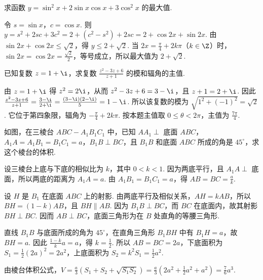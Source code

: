 \documentclass[UTF8,a4paper,oneside,11pt]{ctexbook}
\begin{document}
\begin{problem}
求函数 \(y = \sin^{2} x + 2\sin x\cos x + 3\cos^{2} x\) 的最大值.
\end{problem}

\begin{solution}
令 \(s=\sin x\)，\(c=\cos x\). 则
\(y=s^2+2sc+3c^2=2+(c^2-s^2)+2sc=2+\cos2x+\sin2x\).
由 \(\sin2x+\cos2x\leq\sqrt2\)，得 \(y\leq2+\sqrt2\). 当 \(2x=\frac\pi4+2k\pi\)（\(k\in\Z\)）时，\(\sin2x=\cos2x=\frac{\sqrt2}{2}\)，等号成立，所以最大值为 \(2+\sqrt2\).
\end{solution}

\begin{problem}
已知复数 \(z = 1 + \i\)，求复数 \(\frac{z^{2} - 3z + 6}{z + 1}\) 的模和辐角的主值.
\end{problem}

\begin{solution}
由 \(z=1+\i\) 得 \(z^2=2\i\)，从而 \(z^2-3z+6=3-\i\)，且 \(z+1=2+\i\). 因此
\(\frac{z^2-3z+6}{z+1}=\frac{3-\i}{2+\i}=\frac{(3-\i)(2-\i)}{5}=1-\i\).
所以该复数的模为 \(\sqrt{1^2+(-1)^2}=\sqrt2\). 它位于第四象限，辐角为 \(-\frac\pi4+2k\pi\). 按本题主值取 \(0\leq\theta<2\pi\)，主值为 \(\frac{7\pi}{4}\).
\end{solution}

\begin{problem}
如图，在三棱台 \(ABC - A_{1}B_{1}C_{1}\) 中，已知 \(AA_{1}\perp\) 底面 \(ABC\)，\(A_{1}A=A_{1}B_{1}=B_{1}C_{1}=a\)，\(B_{1}B\perp BC\)，且 \(B_{1}B\) 和底面 \(ABC\) 所成的角是 \(45^{\circ}\)，求这个棱台的体积.

\end{problem}

\begin{solution}
设三棱台上底与下底的相似比为 \(k\)，其中 \(0<k<1\). 因为两底平行，且 \(A_1A\perp\) 底面，所以两底的距离为 \(A_1A=a\). 由 \(A_1B_1=B_1C_1=a\)，得 \(AB=BC=\frac{a}{k}\).

设 \(H\) 是 \(B_1\) 在底面 \(ABC\) 上的射影. 由两底平行及相似关系，\(AH=kAB\)，所以 \(BH=(1-k)AB\)，且 \(BH\parallel AB\). 因为 \(B_1B\perp BC\)，而 \(BC\) 在底面内，故其射影 \(BH\perp BC\). 因而 \(AB\perp BC\)，底面三角形为在 \(B\) 处直角的等腰三角形.

直线 \(B_1B\) 与底面所成的角为 \(45^\circ\)，在直角三角形 \(B_1BH\) 中有 \(B_1H=a\)，故 \(BH=a\). 因此 \(\frac{1-k}{k}a=a\)，得 \(k=\frac12\). 所以 \(AB=BC=2a\)，下底面积为 \(S_1=\frac12(2a)^2=2a^2\)，上底面积为 \(S_2=k^2S_1=\frac12a^2\).

由棱台体积公式，\(V=\frac{a}{3}\left(S_1+S_2+\sqrt{S_1S_2}\right)=\frac{a}{3}\left(2a^2+\frac12a^2+a^2\right)=\frac76a^3\).
\end{solution}
\end{document}
